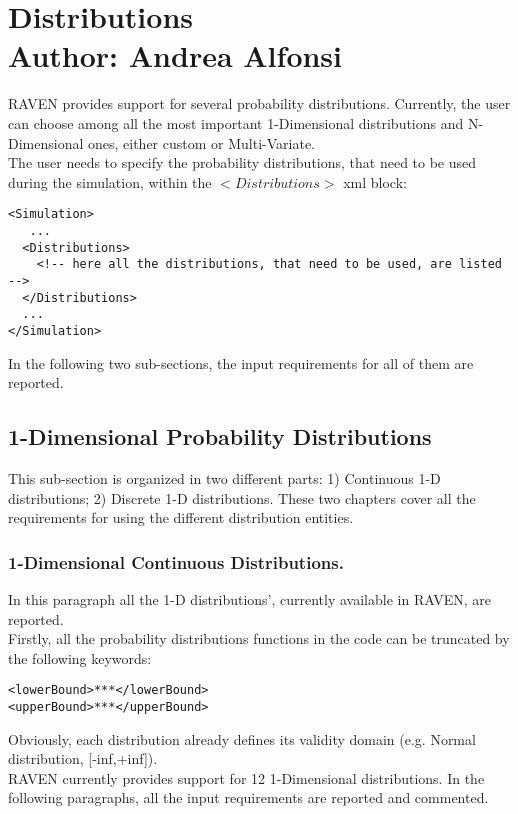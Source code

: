 \section{Distributions \\ \vspace{2 mm} {\small Author: Andrea Alfonsi}}
\label{sec:distributions}
\newcommand{\distname}[1]{\textbf{#1}}
\newcommand{\distattrib}[1]{\textit{#1}}
RAVEN provides support for several probability distributions. Currently, the user can choose among all the most important 1-Dimensional distributions and N-Dimensional ones, either custom or Multi-Variate.  
\\ The user needs to specify the probability distributions, that need to be used during the simulation, within the $<Distributions>$ xml block:
\begin{lstlisting}[style=XML]
<Simulation>
   ...
  <Distributions>
    <!-- here all the distributions, that need to be used, are listed -->
  </Distributions>
  ...
</Simulation>
\end{lstlisting}
In the following two sub-sections, the input requirements for all of them are reported.
\subsection{1-Dimensional Probability Distributions}
\label{subsec:1dDist}

This sub-section is organized in two different parts: 1) Continuous 1-D distributions; 2) Discrete 1-D distributions. These two chapters cover all the  requirements for using the different distribution entities. 
\subsubsection{1-Dimensional Continuous Distributions.}
\label{subsubsec:1DContinuous}

In this paragraph all the 1-D distributions', currently available in RAVEN, are reported.
\\ Firstly, all the probability distributions functions in the code can be truncated by the following keywords:
\begin{lstlisting}[style=XML]
<lowerBound>***</lowerBound>
<upperBound>***</upperBound>
\end{lstlisting}
Obviously, each distribution already defines its validity domain (e.g. Normal distribution, [-inf,+inf]).
\\ RAVEN currently provides support for 12 1-Dimensional distributions.  In the following paragraphs, all the input requirements are reported and commented.


